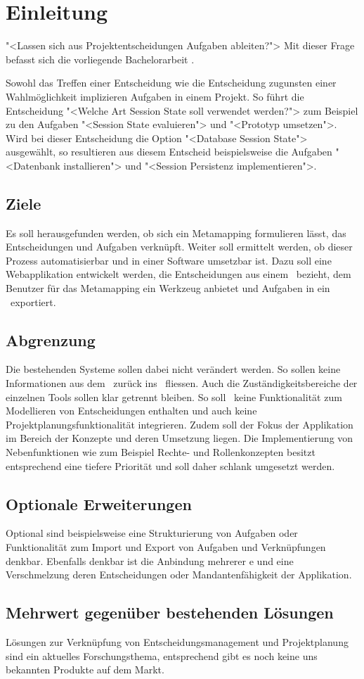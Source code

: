 \chapter{Einleitung}
	"<Lassen sich aus Projektentscheidungen Aufgaben ableiten?">
	Mit dieser Frage befasst sich die vorliegende Bachelorarbeit \eeppi.
		
	Sowohl das Treffen einer Entscheidung wie die Entscheidung zugunsten einer Wahlmöglichkeit implizieren Aufgaben in einem Projekt.
	So führt die Entscheidung "<Welche Art Session State soll verwendet werden?"> zum Beispiel zu den Aufgaben
	"<Session State evaluieren"> und "<Prototyp umsetzen">.		
	Wird bei dieser Entscheidung die Option "<Database Session State"> ausgewählt,
	so resultieren aus diesem Entscheid beispielsweise die Aufgaben "<Datenbank installieren"> und "<Session Persistenz implementieren">.
	
	
	\section{Ziele}
	Es soll herausgefunden werden, ob sich ein Metamapping formulieren lässt,
	das Entscheidungen und Aufgaben verknüpft.
	Weiter soll ermittelt werden, ob dieser Prozess automatisierbar und in einer Software umsetzbar ist.
	Dazu soll eine Webapplikation entwickelt werden, die Entscheidungen aus einem \dks\ bezieht, 
	dem Benutzer für das Metamapping ein Werkzeug anbietet und Aufgaben in ein \ppt\ exportiert.
	
	
	\section{Abgrenzung}
	Die bestehenden Systeme sollen dabei nicht verändert werden. So sollen keine Informationen aus dem \ppt\ zurück ins \dks\ fliessen.
	Auch die Zuständigkeitsbereiche der einzelnen Tools sollen klar getrennt bleiben.
	So soll \eeppi\ keine Funktionalität zum Modellieren von Entscheidungen enthalten und auch keine Projektplanungsfunktionalität integrieren.
	Zudem soll der Fokus der Applikation im Bereich der Konzepte und deren Umsetzung liegen. Die Implementierung von Nebenfunktionen wie zum Beispiel Rechte- und Rollenkonzepten besitzt entsprechend eine tiefere Priorität und soll daher schlank umgesetzt werden.
	
	
	\section{Optionale Erweiterungen}
	Optional sind beispielsweise eine Strukturierung von Aufgaben oder Funktionalität zum Import und Export von Aufgaben und Verknüpfungen denkbar.	
	Ebenfalls denkbar ist die Anbindung mehrerer \dks e und eine Verschmelzung deren Entscheidungen oder Mandantenfähigkeit der Applikation.
	
	
	\section{Mehrwert gegenüber bestehenden Lösungen}
	Lösungen zur Verknüpfung von Entscheidungsmanagement und Projektplanung sind ein aktuelles Forschungsthema, 
	entsprechend gibt es noch keine uns bekannten Produkte auf dem Markt.
	 		
		
	